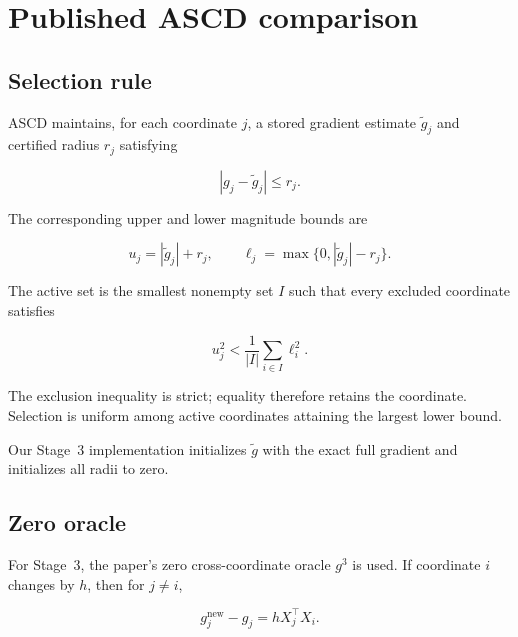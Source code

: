 \documentclass[11pt]{article}
\begin{document}
\FloatBarrier


\section{Published ASCD comparison}

\subsection{Selection rule}

ASCD \cite{stich2017} maintains, for each coordinate $j$, a stored
gradient estimate $\widetilde g_j$ and certified radius $r_j$ satisfying

\begin{equation}
|g_j-\widetilde g_j|
\le r_j.
\label{eq:interval}
\end{equation}

The corresponding upper and lower magnitude bounds are

\begin{equation}
u_j
=
|\widetilde g_j|+r_j,
\qquad
\ell_j
=
\max\{0,|\widetilde g_j|-r_j\}.
\label{eq:upper-lower}
\end{equation}

The active set is the smallest nonempty set $I$ such that every
excluded coordinate satisfies

\begin{equation}
u_j^2
<
\frac{1}{|I|}
\sum_{i\in I}\ell_i^2.
\label{eq:active-set}
\end{equation}

The exclusion inequality is strict; equality therefore retains the
coordinate. Selection is uniform among active coordinates attaining the
largest lower bound.

Our Stage~3 implementation initializes $\widetilde g$ with the exact
full gradient and initializes all radii to zero.


\subsection{Zero oracle}

For Stage~3, the paper's zero cross-coordinate oracle $g^3$ is used.
If coordinate $i$ changes by $h$, then for $j\ne i$,

\begin{equation}
g_j^{\mathrm{new}}-g_j
=
hX_j^\top X_i.
\end{equation}
\end{document}
